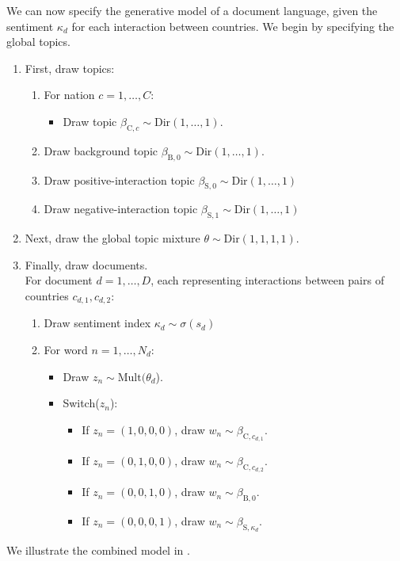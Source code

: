 We can now specify the generative model of a document language, given
the sentiment $\kappa_d$ for each interaction between countries.  We
begin by specifying the global topics.
\begin{enumerate}
\item First, draw topics:
  \begin{enumerate}
  \item For nation $c=1, \ldots, C$:
    \begin{itemize}
    \item Draw topic $\beta_{\mbox{C},c} \sim \mbox{Dir}(1, \ldots, 1)$.
    \end{itemize}
  \item Draw background topic $\beta_{\mbox{B},0} \sim \mbox{Dir}(1, \ldots, 1)$.
  \item Draw positive-interaction topic $\beta_{\mbox{S},0} \sim \mbox{Dir}(1, \ldots, 1)$
  \item Draw negative-interaction topic $\beta_{\mbox{S},1} \sim \mbox{Dir}(1, \ldots, 1)$
\end{enumerate}

\item Next, draw the global topic mixture $\theta \sim \mbox{Dir}(1, 1, 1, 1)$.

\item Finally, draw documents. \\
For document $d=1, \ldots, D$, each representing interactions between pairs of countries $c_{d,1},c_{d,2}$:
  \begin{enumerate}
    \item Draw sentiment index $\kappa_d \sim \sigma(s_d)$
    \item For word $n = 1, \ldots, N_d$:
    \begin{itemize}
      \item Draw $z_{n} \sim \mbox{Mult}(\theta_d$).
      \item Switch($z_n$):
      \begin{itemize}
        \item If $z_n = (1, 0, 0, 0)$, draw $w_n \sim \beta_{\mbox{C},c_{d,1}}$.
        \item If $z_n = (0, 1, 0, 0)$, draw $w_n \sim \beta_{\mbox{C},c_{d,2}}$.
        \item If $z_n = (0, 0, 1, 0)$, draw $w_n \sim \beta_{\mbox{B},0}$.
        \item If $z_n = (0, 0, 0, 1)$, draw $w_n \sim \beta_{\mbox{S},\kappa_d}$.
      \end{itemize}
    \end{itemize}
  \end{enumerate}
\end{enumerate}
We illustrate the combined model in
.

